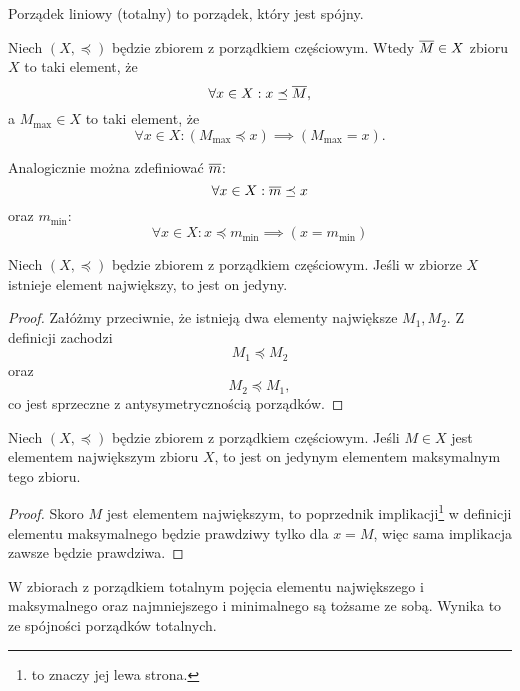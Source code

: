 \documentclass[11pt]{scrartcl}
\begin{document}
    \begin{definition}
        Porządek liniowy (totalny) to porządek, który jest spójny.
    \end{definition}

    Niech $(X, \preceq)$ będzie zbiorem z porządkiem częściowym. Wtedy  $\overline{M} \in X$ zbioru $X$ to taki element, że
    $$ \forall x \in X : x \preceq \overline{M}, $$
    a  $M_{\max} \in X$ to taki element, że
    $$ \forall x \in X : (M_{\max} \preceq x) \implies (M_{\max} = x). $$

    \begin{remark}
        Analogicznie można zdefiniować  $\overline{m}$:
        $$ \forall x \in X : \overline{m} \preceq x $$
        oraz  $m_{\min}$:
        $$ \forall x \in X : x \preceq m_{\min} \implies (x = m_{\min}) $$
    \end{remark}

    \begin{theorem}
        \label{t:uniq_greatest}
        Niech $(X, \preceq)$ będzie zbiorem z porządkiem częściowym. Jeśli w zbiorze $X$ istnieje element największy, to jest on jedyny.
    \end{theorem}
    \begin{proof}
        Załóżmy przeciwnie, że istnieją dwa elementy największe $M_1, M_2$. Z definicji zachodzi
        $$ M_1 \preceq M_2 $$
        oraz
        $$ M_2 \preceq M_1, $$
        co jest sprzeczne z antysymetrycznością porządków.
    \end{proof}

    \begin{theorem}
        Niech $(X, \preceq)$ będzie zbiorem z porządkiem częściowym. Jeśli $M \in X$ jest elementem największym zbioru $X$, to jest on jedynym elementem maksymalnym tego zbioru.
    \end{theorem}
    \begin{proof}
        Skoro $M$ jest elementem największym, to poprzednik implikacji\footnote{to znaczy jej lewa strona.} w definicji elementu maksymalnego będzie prawdziwy tylko dla $x = M$, więc sama implikacja zawsze będzie prawdziwa.
    \end{proof}

    \begin{fact}
        \label{f:greatest=maximal}
        W zbiorach z porządkiem totalnym pojęcia elementu największego i maksymalnego oraz najmniejszego i minimalnego są tożsame ze sobą. Wynika to ze spójności porządków totalnych.
    \end{fact}
\end{document}
